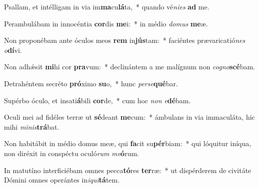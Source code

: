 \item Psallam, et intélligam in via im\textbf{ma}cu\textbf{lá}ta,~* quando vé\textit{ni}\textit{es} \textbf{ad} me.
\item Perambulábam in innocéntia \textbf{cor}dis \textbf{me}i:~* in médio \textit{do}\textit{mus} \textbf{me}æ.
\item Non proponébam ante óculos meos \textbf{rem} in\textbf{jús}tam:~* faciéntes prævaricatió\textit{nes} \textit{o}\textbf{dí}vi.
\item Non adhǽsit \textbf{mi}hi cor \textbf{pra}vum:~* declinántem a me malígnum non \textit{co}\textit{gno}\textbf{scé}bam.
\item Detrahéntem secréto \textbf{pró}ximo \textbf{su}o,~* hunc \textit{per}\textit{se}\textbf{qué}bar.
\item Supérbo óculo, et insati\textbf{á}bili \textbf{cor}de,~* cum hoc \textit{non} \textit{e}\textbf{dé}bam.
\item Oculi mei ad fidéles terræ ut \textbf{sé}deant \textbf{me}cum:~* ámbulans in via immaculáta, hic mihi \textit{mi}\textit{nis}\textbf{trá}bat.
\item Non habitábit in médio domus meæ, qui \textbf{fa}cit su\textbf{pér}biam:~* qui lóquitur iníqua, non diréxit in conspéctu oculó\textit{rum} \textit{me}\textbf{ó}rum.
\item In matutíno interficiébam omnes pecca\textbf{tó}res \textbf{ter}ræ:~* ut dispérderem de civitáte Dómini omnes operántes in\textit{i}\textit{qui}\textbf{tá}tem.
